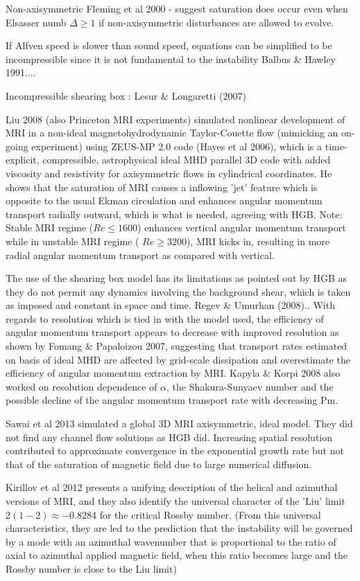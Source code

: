 \documentclass{jfm}
\begin{document}
Non-axisymmetric Fleming et al 2000 - suggest saturation does occur even when Elsasser numb $\Delta \ge 1$ if non-axisymmetric disturbances are allowed to evolve.

If Alfven speed is slower than sound speed, equations can be simplified to be incompressible since it is not fundamental to the instability Balbus \& Hawley 1991....

Incompressible shearing box : Lesur \& Longaretti (2007)

Liu 2008 (also Princeton MRI experiments) simulated nonlinear development of MRI in a non-ideal magnetohydrodynamic Taylor-Couette flow (mimicking an on-going experiment) using ZEUS-MP 2.0 code (Hayes et al 2006), which is a time-explicit, compressible, astrophysical ideal MHD parallel 3D code with added viscosity and resistivity for axisymmetric flows in cylindrical coordinates. He shows that the saturation of MRI causes a inflowing 'jet' feature which is opposite to the usual Ekman circulation and enhances angular momentum transport radially outward, which is what is needed, agreeing with HGB. Note: Stable MRI regime ($ Re \le 1600$) enhances vertical angular momentum transport while in unstable MRI regime ( $ Re \ge 3200$), MRI kicks in, resulting in more radial angular momentum transport as compared with vertical.

The use of the shearing box model has its limitations as pointed out by HGB as they do not permit any dynamics involving the background shear, which is taken as imposed and constant in space and time. Regev \& Umurhan (2008).. With regards to resolution which is tied in with the model used, the efficiency of angular momentum transport appears to decrease with improved resolution as shown by Fomang \& Papaloizou 2007, suggesting that transport rates estimated on basis of ideal MHD are affected by grid-scale dissipation and overestimate the efficiency of angular momentum extraction by MRI. Kapyla \& Korpi 2008 also worked on resolution dependence of $\alpha$, the Shakura-Sunyaev number and the possible decline of the angular momentum transport rate with decreasing Pm.

Sawai et al 2013 simulated a global 3D MRI axisymmetric, ideal model. They did not find any channel flow solutions as HGB did. Increasing spatial resolution contributed to approximate convergence in the exponential growth rate but not that of the saturation of magnetic field due to large numerical diffusion.

Kirillov et al 2012 presents a unifying description of the helical and azimuthal versions of MRI, and they also identify the universal character of the 'Liu' limit $2(1 - 2) \approx - 0.8284$ for the critical Rossby number. (From this universal characteristics, they are led to the prediction that the instability will be governed by a mode with an azimuthal wavenumber that is proportional to the ratio of axial to azimuthal applied magnetic field, when this ratio becomes large and the Rossby number is close to the Liu limit)
\end{document}
